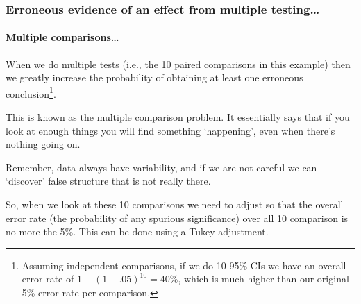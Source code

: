 \documentclass{beamer}\usepackage[]{graphicx}\usepackage[]{xcolor}
\begin{document}
\begin{frame}[fragile]
\frametitle{Erroneous evidence of an effect from multiple testing\ldots}
\framesubtitle{Multiple comparisons\ldots}

When we do multiple tests (i.e., the 10 paired comparisons in this example) then we greatly increase the probability of obtaining at least one erroneous conclusion\footnote{ Assuming independent comparisons, if we do 10 95\% CIs we have an overall error rate of $1-(1-.05)^{10}=40\%$, which is much higher than our original 5\% error rate per comparison.}.

\medskip 

This is known as the multiple comparison problem. It essentially says that if you look at enough things you will find something `happening', even when there's nothing going on.

\medskip

Remember, data always have variability, and if we are not careful we can `discover' false structure that is not really there.

\medskip 

So, when we look at these 10 comparisons we need to adjust so that the overall error rate (the probability of any spurious significance) over all 10 comparison is no more the 5\%. This can be done using a Tukey adjustment.

\end{frame}
\end{document}
